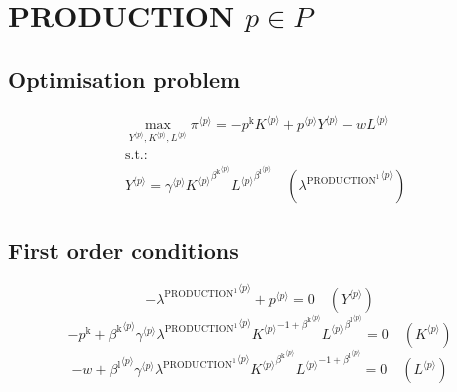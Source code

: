 \section{PRODUCTION $p\in P$}

\subsection{Optimisation problem}

\begin{align}
&\max_{{Y}^{\langle p\rangle}, {K}^{\langle p\rangle}, {L}^{\langle p\rangle}
} {\pi}^{\langle p\rangle} = -{p^{\mathrm{k}}} {{K}^{\langle p\rangle}} + {{p}^{\langle p\rangle}} {{Y}^{\langle p\rangle}} - {w} {{L}^{\langle p\rangle}}\\
&\mathrm{s.t.:}\nonumber\\
& {Y}^{\langle p\rangle} = {{\gamma}^{\langle p\rangle}} {{{K}^{\langle p\rangle}}^{{\beta^{\mathrm{k}}}^{\langle p\rangle}}} {{{L}^{\langle p\rangle}}^{{\beta^{\mathrm{l}}}^{\langle p\rangle}}} \quad \left({\lambda^{\mathrm{PRODUCTION}^{\mathrm{1}}}}^{\langle p\rangle}\right)
\end{align}


\subsection{First order conditions}

\begin{equation}
-{\lambda^{\mathrm{PRODUCTION}^{\mathrm{1}}}}^{\langle p\rangle} + {p}^{\langle p\rangle} = 0
 \quad \left({Y}^{\langle p\rangle}\right)
\end{equation}
\begin{equation}
-p^{\mathrm{k}} + {{\beta^{\mathrm{k}}}^{\langle p\rangle}} {{\gamma}^{\langle p\rangle}} {{\lambda^{\mathrm{PRODUCTION}^{\mathrm{1}}}}^{\langle p\rangle}} {{{K}^{\langle p\rangle}}^{-1 + {\beta^{\mathrm{k}}}^{\langle p\rangle}}} {{{L}^{\langle p\rangle}}^{{\beta^{\mathrm{l}}}^{\langle p\rangle}}} = 0
 \quad \left({K}^{\langle p\rangle}\right)
\end{equation}
\begin{equation}
-w + {{\beta^{\mathrm{l}}}^{\langle p\rangle}} {{\gamma}^{\langle p\rangle}} {{\lambda^{\mathrm{PRODUCTION}^{\mathrm{1}}}}^{\langle p\rangle}} {{{K}^{\langle p\rangle}}^{{\beta^{\mathrm{k}}}^{\langle p\rangle}}} {{{L}^{\langle p\rangle}}^{-1 + {\beta^{\mathrm{l}}}^{\langle p\rangle}}} = 0
 \quad \left({L}^{\langle p\rangle}\right)
\end{equation}


